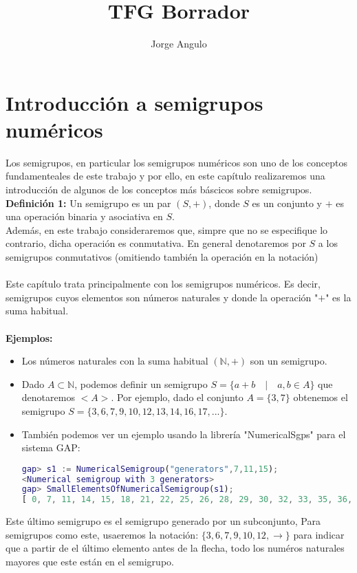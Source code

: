 \documentclass[10pt,spanish]{book}
\author{Jorge Angulo}
\title{TFG Borrador}
\begin{document}
\maketitle
\chapter{Introducción a semigrupos numéricos}
Los semigrupos, en particular los semigrupos numéricos son uno de los conceptos fundamenteales de este trabajo y por ello, en este capítulo realizaremos una introducción de algunos de los conceptos más báscicos sobre semigrupos.\\

\textbf{Definición 1:} Un semigrupo es un par $(S, +)$, donde $S$ es un conjunto y $\textbf{+}$ es una operación binaria y asociativa en $S$.\\ Además, en este trabajo consideraremos que, simpre que no se especifique lo contrario, dicha operación es conmutativa. En general denotaremos por $S$ a los semigrupos conmutativos (omitiendo también la operación en la notación)\\
\\Este capítulo trata principalmente con los semigrupos numéricos. Es decir, semigrupos cuyos elementos son números naturales y donde la operación "$+$" es la suma habitual. \\ 
\\ \textbf{Ejemplos:} 
\begin{itemize}
	\item Los números naturales con la suma habitual $(\mathbb{N}, +)$ son un semigrupo.
	\item Dado $A\subset\mathbb{N}$, podemos definir un semigrupo $S=\{a+b\quad |\quad a, b\in A \}$ que denotaremos $<A>$. Por ejemplo, dado el conjunto $A=\{3,7\}$ obtenemos el semigrupo $S=\{3,6,7,9,10,12,13,14,16,17,...\}$. 
	\item También podemos ver un ejemplo usando la librería "NumericalSgps" para el sistema GAP:\\
	\begin{lstlisting}[language=gap]
gap> s1 := NumericalSemigroup("generators",7,11,15);
<Numerical semigroup with 3 generators>
gap> SmallElementsOfNumericalSemigroup(s1);
[ 0, 7, 11, 14, 15, 18, 21, 22, 25, 26, 28, 29, 30, 32, 33, 35, 36, 37, 39 ]
	\end{lstlisting}
\end{itemize}
Este último semigrupo es el semigrupo generado por un subconjunto, Para semigrupos como este, usaeremos la notación: $\{3,6,7,9,10,12,\rightarrow \}$ para indicar que a partir de el último elemento antes de la flecha, todo los numéros naturales mayores que este están en el semigrupo.\\
\end{document}
